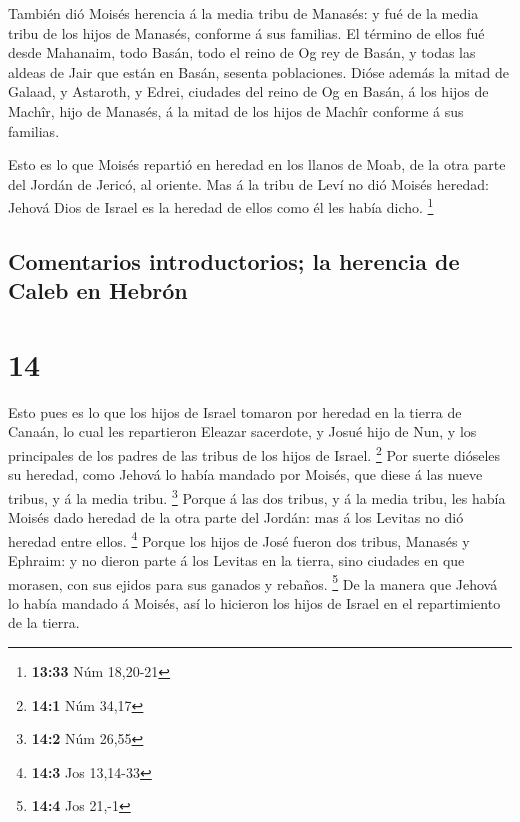  También dió Moisés herencia á la media tribu de Manasés: y
fué de la media tribu de los hijos de Manasés, conforme á sus familias.
 El término de ellos fué desde Mahanaim, todo Basán, todo
el reino de Og rey de Basán, y todas las aldeas de Jair que están en
Basán, sesenta poblaciones.  Dióse además la mitad de
Galaad, y Astaroth, y Edrei, ciudades del reino de Og en Basán, á los
hijos de Machîr, hijo de Manasés, á la mitad de los hijos de Machîr
conforme á sus familias.

 Esto es lo que Moisés repartió en heredad en los llanos de
Moab, de la otra parte del Jordán de Jericó, al oriente. 
Mas á la tribu de Leví no dió Moisés heredad: Jehová Dios de Israel es
la heredad de ellos como él les había dicho. \footnote{\textbf{13:33}
  Núm 18,20-21}

\hypertarget{comentarios-introductorios-la-herencia-de-caleb-en-hebruxf3n}{%
\subsection{Comentarios introductorios; la herencia de Caleb en
Hebrón}\label{comentarios-introductorios-la-herencia-de-caleb-en-hebruxf3n}}

\hypertarget{section-13}{%
\section{14}\label{section-13}}

 Esto pues es lo que los hijos de Israel tomaron por heredad
en la tierra de Canaán, lo cual les repartieron Eleazar sacerdote, y
Josué hijo de Nun, y los principales de los padres de las tribus de los
hijos de Israel. \footnote{\textbf{14:1} Núm 34,17}  Por
suerte dióseles su heredad, como Jehová lo había mandado por Moisés, que
diese á las nueve tribus, y á la media tribu. \footnote{\textbf{14:2}
  Núm 26,55}  Porque á las dos tribus, y á la media tribu,
les había Moisés dado heredad de la otra parte del Jordán: mas á los
Levitas no dió heredad entre ellos. \footnote{\textbf{14:3} Jos 13,14-33}
 Porque los hijos de José fueron dos tribus, Manasés y
Ephraim: y no dieron parte á los Levitas en la tierra, sino ciudades en
que morasen, con sus ejidos para sus ganados y rebaños. \footnote{\textbf{14:4}
  Jos 21,-1}  De la manera que Jehová lo había mandado á
Moisés, así lo hicieron los hijos de Israel en el repartimiento de la
tierra.

